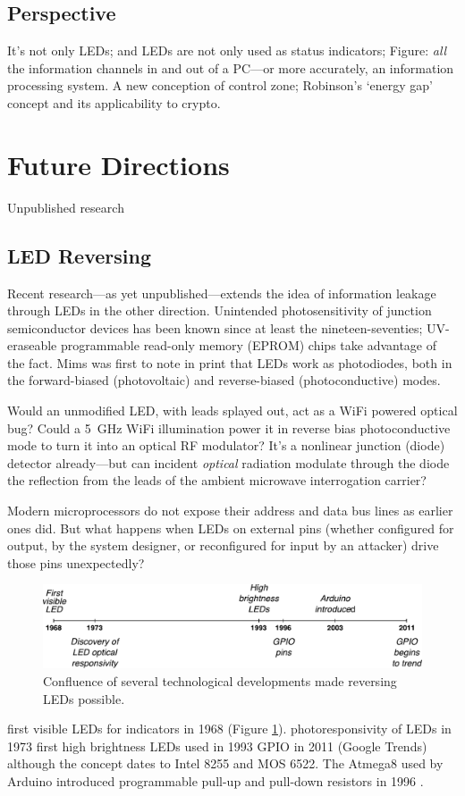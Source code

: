 \documentclass[a4paper,twoside,11pt]{book}
\begin{document}
\subsection{Perspective}
It's not only LEDs; and LEDs are not only used as status indicators; Figure:
\emph{all} the information channels in and out of a PC---or more accurately,
an information processing system. A new conception of control zone;
Robinson's `energy gap' concept and its applicability to crypto.
\section{Future Directions}
Unpublished research
\subsection{LED Reversing}
Recent research---as yet unpublished---extends the idea of information leakage
through LEDs in the other direction. Unintended photosensitivity of junction
semiconductor devices has been known since at least the nineteen-seventies;
UV-eraseable programmable read-only memory (EPROM) chips take advantage of the
fact. Mims \citeyear{Mims1973b} was first to note in print that LEDs work as
photodiodes, both in the forward-biased (photovoltaic) and reverse-biased
(photoconductive) modes.

Would an unmodified LED, with leads splayed out, act as a WiFi powered
optical bug? Could a \SI{5}{\giga\hertz} WiFi illumination power it in
reverse bias photoconductive mode to turn it into an optical RF
modulator? It's a nonlinear junction (diode) detector already---but can
incident \emph{optical} radiation modulate through the diode the reflection
from the leads of the ambient microwave interrogation carrier?

Modern microprocessors do not expose their address and data bus lines as
earlier ones did. But what happens when LEDs on external pins (whether
configured for output, by the system designer, or reconfigured for input by an
attacker) drive those pins unexpectedly?
\begin{figure}[ht]
  \centering
  \includegraphics[width=\textwidth]{timeline.pdf}
  \caption{Confluence of several technological developments made reversing LEDs
    possible.}
  \label{figure:timeline}
\end{figure}
first visible LEDs for indicators in 1968 (Figure \ref{figure:timeline}).
photoresponsivity of LEDs in 1973
first high brightness LEDs used in 1993
GPIO in 2011 (Google Trends) although the concept dates to Intel 8255 and MOS
6522. The Atmega8 used by Arduino introduced programmable pull-up and pull-down
resistors in 1996 \cite{Mims1973b,Atmel2013,Stringfellow1997}.
\end{document}
